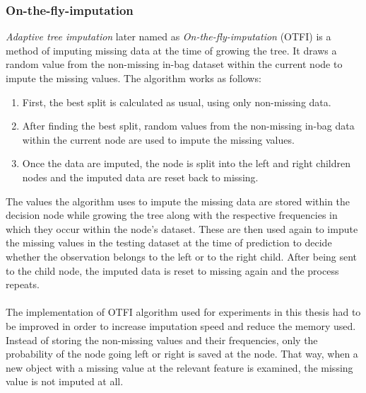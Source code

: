 \documentclass[11pt]{article}
\begin{document}
      \subsubsection{On-the-fly-imputation}
        \label{sec:otfi}
        {\it Adaptive tree imputation}\cite{rsf} later named as {\it On-the-fly-imputation}\cite{otfi} (OTFI) is a method of imputing missing data at the time of growing the tree. It draws a random value from the non-missing in-bag dataset within the current node to impute the missing values. The algorithm works as follows: 
        \begin{enumerate}
        \item First, the best split is calculated as usual, using only non-missing data.
        \item After finding the best split, random values from the non-missing in-bag data within the current node are used to impute the missing values.
        \item Once the data are imputed, the node is split into the left and right children nodes and the imputed data are reset back to missing.
        \end{enumerate}
        The values the algorithm uses to impute the missing data are stored within the decision node while growing the tree along with the respective frequencies in which they occur within the node's dataset. These are then used again to impute the missing values in the testing dataset at the time of prediction to decide whether the observation belongs to the left or to the right child. After being sent to the child node, the imputed data is reset to missing again and the process repeats.
        \\~\\
        The implementation of OTFI algorithm used for experiments in this thesis had to be improved in order to increase imputation speed and reduce the memory used. Instead of storing the non-missing values and their frequencies, only the probability of the node going left or right is saved at the node. That way, when a new object with a missing value at the relevant feature is examined, the missing value is not imputed at all.
\end{document}
